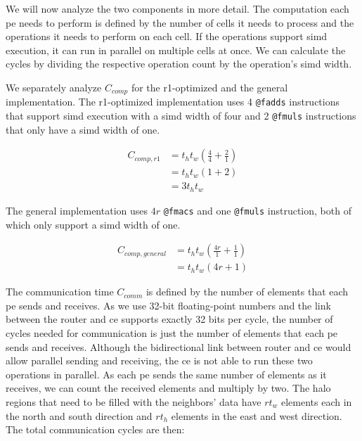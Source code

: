 We will now analyze the two components in more detail. The computation each \ac{pe} needs to perform is defined by the number of cells it needs to process and the operations it needs to perform on each cell. If the operations support \ac{simd} execution, it can run in parallel on multiple cells at once. We can calculate the cycles by dividing the respective operation count by the operation's \ac{simd} width.

We separately analyze $C_{comp}$ for the r1-optimized and the general implementation. The r1-optimized implementation uses 4 \texttt{@fadds} instructions that support \ac{simd} execution with a \ac{simd} width of four and 2 \texttt{@fmuls} instructions that only have a \ac{simd} width of one.

\begin{equation}
    \begin{aligned}
        \label{eq:c_comp_r1}
        C_{comp,r1} &= t_h t_w \left(\frac{4}{4} + \frac{2}{1}\right) \\[1ex]
        &= t_h t_w \left(1 + 2\right) \\[1ex]
        &= 3 t_h t_w
    \end{aligned}
\end{equation}

The general implementation uses $4r$ \texttt{@fmacs} and one \texttt{@fmuls} instruction, both of which only support a \ac{simd} width of one.

\begin{equation}
    \label{eq:c_comp_general}
    \begin{aligned}
        C_{comp,general} &= t_h t_w \left(\frac{4r}{1} + \frac{1}{1}\right) \\[1ex]
        &= t_h t_w \left(4r + 1\right)
    \end{aligned}
\end{equation}


The communication time $C_{comm}$ is defined by the number of elements that each \ac{pe} sends and receives. As we use 32-bit floating-point numbers and the link between the router and \ac{ce} supports exactly 32 bits per cycle, the number of cycles needed for communication is just the number of elements that each \ac{pe} sends and receives. Although the bidirectional link between router and \ac{ce} would allow parallel sending and receiving, the \ac{ce} is not able to run these two operations in parallel. As each \ac{pe} sends the same number of elements as it receives, we can count the received elements and multiply by two. The halo regions that need to be filled with the neighbors' data have $r t_w$ elements each in the north and south direction and $r t_h$ elements in the east and west direction. The total communication cycles are then:

